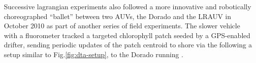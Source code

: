 Successive lagrangian experiments also followed a more innovative and
robotically choreographed ``ballet'' between two AUVs, the Dorado and
the LRAUV \cite{bellingham10} in October 2010 as part of another
series of \can field experiments. The slower vehicle with a
fluorometer tracked a targeted chlorophyll patch seeded by a
GPS-enabled drifter, sending periodic updates of the patch centroid to
shore via the \od following a setup similar to
Fig.\ref{fig:dta-setup}, to the Dorado running \rxe.

\begin{figure}
\centering 
{} 
\\

\end{figure}
